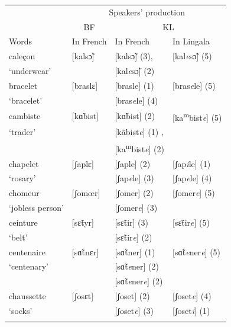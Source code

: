 \documentclass[output=paper]{langscibook}
\begin{document}
\begin{table}
    \begin{tabular}{*4{l}}
    \lsptoprule
     & \multicolumn{3}{c}{Speakers' production}\\\cmidrule(lr){2-4}
     & \multicolumn{1}{c}{BF} & \multicolumn{2}{c}{{KL}} \\\cmidrule(lr){2-2}\cmidrule(lr){3-4}
    {Words} & {In French} & {In French} & {In Lingala}  \\\midrule
    caleçon  & [kalsɔ̃]& [kalsɔ̃] (3),  & [kal\textit{e}sɔ̃] (5) \\
    `underwear' & & [kal\textit{e}sɔ̃] (2) & \\
    \tablevspace

    bracelet & [braslɛ] & [brasle] (1)  & [bras\textit{e}le] (5) \\
    `bracelet' & & [bras\textit{e}le] (4) & \\
    \tablevspace

    cambiste & [kɑ̃bist] & [kɑ̃bist] (2) & [ka\textsuperscript{m}bist\textit{e}] (5)\\
    `trader'  & & [kãbist\textit{e}] (1) , & \\
    & & [ka\textsuperscript{m}bist\textit{e}] (2) & \\
    \tablevspace

    chapelet & [ʃaplɛ] & [ʃaple] (2) & [ʃap\textit{i}le] (1) \\
    `rosary' &  & [ʃap\textit{e}le] (3) & [ʃap\textit{e}le] (4) \\
    \tablevspace

    chomeur & [ʃomœr] & [ʃomer] (2) & [ʃomer\textit{e}] (5) \\
   `jobless person' & & [ʃomer\textit{e}] (3) & \\
    \tablevspace

    ceinture & [sɛ̃tyr] & [sɛ̃tir] (3) & [sɛ̃tir\textit{e}] (5) \\
    `belt' & & [sɛ̃tir\textit{e}] (2) & \\
    \tablevspace

    centenaire & [sɑ̃tnɛr] & [sɑ̃tner] (1) & [sɑ̃t\textit{e}ner\textit{e}] (5) \\
    `centenary' & & [sɑ̃t\textit{e}ner] (2) & \\
    & & [sɑ̃t\textit{e}ner\textit{e}] (2) & \\
    \tablevspace

    chaussette & [ʃosɛt] & [ʃoset] (2) & [ʃoset\textit{e}] (4) \\
    `socks' & & [ʃoset\textit{e}] (3) & [ʃoset\textit{i}] (1) \\
    \tablevspace


\end{tabular}
\end{table}
\end{document}
